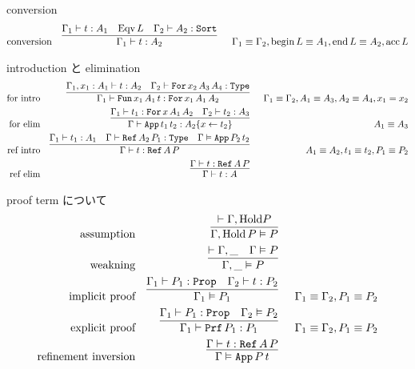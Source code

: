 \begin{itembox}[l]{conversion}
\begin{align*}
  \text{conversion} &&
  \infer[]{
    \Gamma_1 \vdash t : A_2}{\Gamma_1 \vdash t : A_1 & \text{Eqv} \, L & \Gamma_2 \vdash A_2 : \texttt{Sort}
  } && \Gamma_1 \equiv \Gamma_2 , \text{begin} \, L \equiv A_1 , \text{end} \, L \equiv A_2 , \text{acc} \, L
\end{align*}
\end{itembox}

\begin{itembox}[l]{introduction と elimination}
\begin{align*}
  \text{for intro} &&
  \infer[]{
    \Gamma_1 \vdash \texttt{Fun} \, x_1 \, A_1 \, t : \texttt{For} \, x_1 \, A_1 \, A_2}{\Gamma_1 , x_1 : A_1 \vdash t : A_2 & \Gamma_2 \vdash \texttt{For} \, x_2 \, A_3 \, A_4 : \texttt{Type}
  } && \Gamma_1 \equiv \Gamma_2 , A_1 \equiv A_3 , A_2 \equiv A_4 , x_1 = x_2 \\
  \text{for elim} &&
  \infer[]{
    \Gamma \vdash \texttt{App} \, t_1 \, t_2 : A_2\{x \leftarrow t_2\}}{\Gamma_1 \vdash t_1 : \texttt{For} \, x \, A_1 \, A_2 & \Gamma_2 \vdash t_2 : A_3
  } && A_1 \equiv A_3 \\
  \text{ref intro} &&
  \infer[]{
    \Gamma \vdash t : \texttt{Ref} \, A \, P}{\Gamma_1 \vdash t_1 : A_1 & \Gamma \vdash \texttt{Ref} \, A_2 \, P_1 : \texttt{Type} & \Gamma \vDash \texttt{App} \, P_2 \, t_2
  } && A_1 \equiv A_2 , t_1 \equiv t_2 , P_1 \equiv P_2 \\
  \text{ref elim} &&
  \infer[]{
    \Gamma \vdash t : A}{\Gamma \vdash t : \texttt{Ref} \, A \, P}
\end{align*}
\end{itembox}

\begin{itembox}[l]{proof term について}
\begin{align*}
  \text{assumption} &&
  \infer[]{\Gamma , \text{Hold} \, P \vDash P}{\vdash \Gamma , \text{Hold} P} \\
  \text{weakning} &&
  \infer[]{\Gamma , \_ \vDash P}{ \vdash \Gamma , \_ & \Gamma \vDash P} \\
  \text{implicit proof} &&
  \infer[]{
    \Gamma_1 \vDash P_1}{\Gamma_1 \vdash P_1 : \texttt{Prop} & \Gamma _2 \vdash t : P_2
  } && \Gamma_1 \equiv \Gamma_2 , P_1 \equiv P_2 \\
  \text{explicit proof} &&
  \infer[]{
    \Gamma_1 \vdash \texttt{Prf} \, P_1 : P_1}{\Gamma_1 \vdash P_1 : \texttt{Prop} &\Gamma_2 \vDash P_2
  } && \Gamma_1 \equiv \Gamma_2 , P_1 \equiv P_2 \\
  \text{refinement inversion} && 
  \infer[]{\Gamma \vDash \texttt{App} \, P \, t}{\Gamma \vdash t : \texttt{Ref} \, A \, P}
\end{align*}
\end{itembox}
